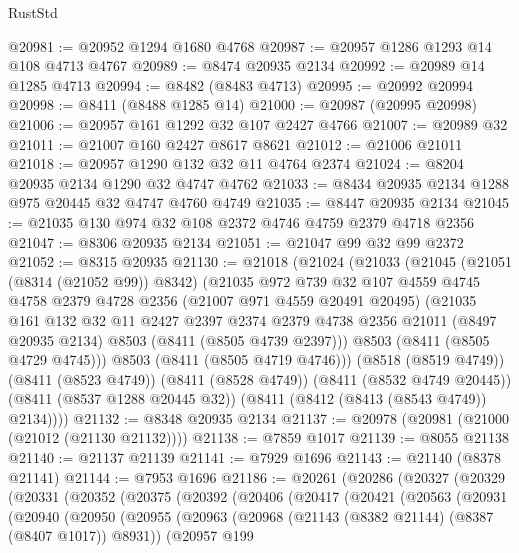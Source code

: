 \begin{lexlean}{RustStd}
\begin{coremodule}
@20981 := @20952 @1294 @1680 @4768
@20987 := @20957 @1286 @1293 @14 @108 @4713 @4767
@20989 := @8474 @20935 @2134
@20992 := @20989 @14 @1285 @4713
@20994 := @8482 (@8483 @4713)
@20995 := @20992 @20994
@20998 := @8411 (@8488 @1285 @14)
@21000 := @20987 (@20995 @20998)
@21006 := @20957 @161 @1292 @32 @107 @2427 @4766
@21007 := @20989 @32
@21011 := @21007 @160 @2427 @8617 @8621
@21012 := @21006 @21011
@21018 := @20957 @1290 @132 @32 @11 @4764 @2374
@21024 := @8204 @20935 @2134 @1290 @32 @4747 @4762
@21033 := @8434 @20935 @2134 @1288 @975 @20445 @32 @4747 @4760 @4749
@21035 := @8447 @20935 @2134
@21045 := @21035 @130 @974 @32 @108 @2372 @4746 @4759 @2379 @4718 @2356
@21047 := @8306 @20935 @2134
@21051 := @21047 @99 @32 @99 @2372
@21052 := @8315 @20935
@21130 := @21018
    (@21024
      (@21033
        (@21045
          (@21051 (@8314 (@21052 @99)) @8342)
          (@21035
            @972
            @739
            @32
            @107
            @4559
            @4745
            @4758
            @2379
            @4728
            @2356
            (@21007 @971 @4559 @20491 @20495)
            (@21035
              @161
              @132
              @32
              @11
              @2427
              @2397
              @2374
              @2379
              @4738
              @2356
              @21011
              (@8497 @20935 @2134)
              @8503
              (@8411 (@8505 @4739 @2397)))
            @8503
            (@8411 (@8505 @4729 @4745)))
          @8503
          (@8411 (@8505 @4719 @4746)))
        (@8518 (@8519 @4749))
        (@8411 (@8523 @4749))
        (@8411 (@8528 @4749))
        (@8411 (@8532 @4749 @20445))
        (@8411 (@8537 @1288 @20445 @32))
        (@8411 (@8412 (@8413 (@8543 @4749)) @2134))))
@21132 := @8348 @20935 @2134
@21137 := @20978 (@20981 (@21000 (@21012 (@21130 @21132))))
@21138 := @7859 @1017
@21139 := @8055 @21138
@21140 := @21137 @21139
@21141 := @7929 @1696
@21143 := @21140 (@8378 @21141)
@21144 := @7953 @1696
@21186 := @20261
    (@20286
      (@20327
        (@20329
          (@20331
            (@20352
              (@20375
                (@20392
                  (@20406
                    (@20417
                      (@20421
                        (@20563
                          (@20931
                            (@20940
                              (@20950
                                (@20955
                                  (@20963
                                    (@20968 (@21143 (@8382 @21144) (@8387 (@8407 @1017)) @8931))
                                    (@20957
                                      @199

\end{coremodule}
\end{lexlean}
